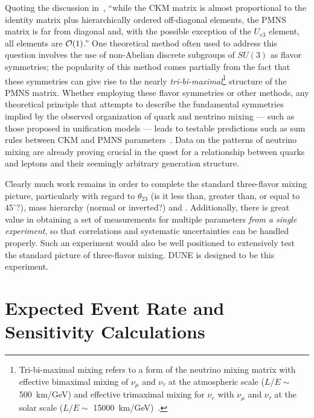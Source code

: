 Quoting the discussion in~\cite{deGouvea:2013onf}, ``while the CKM
matrix is almost proportional to the identity matrix plus
hierarchically ordered off-diagonal elements, the PMNS matrix is far
from diagonal and, with the possible exception of the $U_{e3}$
element, all elements are ${\cal O}(1)$.''
One theoretical method often used to address this question involves the use of non-Abelian discrete
subgroups of $SU(3)$ as flavor symmetries; the popularity of this method comes partially from
the fact that these symmetries can give rise to the nearly \emph{tri-bi-maximal}\footnote{Tri-bi-maximal mixing refers to a form of the neutrino mixing matrix with effective bimaximal mixing of $\nu_\mu$ and $\nu_\tau$
at the atmospheric scale ($L/E \sim$ \SI{500}{\km / \GeV}) and effective trimaximal
mixing for $\nu_e$ with $\nu_\mu$ and $\nu_\tau$ 
at the solar scale ($L/E \sim$ \SI{15000}{\km / \GeV})~\cite{Harrison:2002er}.} 
structure of the PMNS matrix.
Whether employing these flavor symmetries or other methods,
any theoretical principle that attempts to describe the fundamental
symmetries implied by the observed organization of quark and neutrino
mixing --- such as those proposed in unification models --- leads to
testable predictions such as sum rules between CKM and PMNS
parameters~\cite{King:2014nza,deGouvea:2013onf,Mohapatra:2005wg,Albright:2006cw}.
Data on the patterns of neutrino mixing 
are already proving crucial in the quest for a 
relationship between quarks and leptons and their seemingly arbitrary generation
structure.  

Clearly much work remains in order to complete the standard three-flavor 
mixing picture, particularly 
with regard to $\theta_{23}$ (is it less than, greater than, or equal
to $45^\circ$?), mass hierarchy (normal or inverted?) 
and \deltacp.
Additionally, there is 
great value in obtaining a set of measurements for multiple parameters 
\emph{from a single experiment}, so that correlations and systematic 
uncertainties can be handled properly.  Such an experiment would also be 
well positioned to extensively test the standard picture of three-flavor mixing.  
DUNE is designed to be this experiment.

\section{Expected Event Rate and Sensitivity Calculations}

